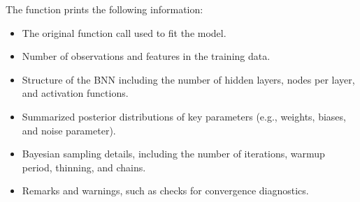\documentclass[a4paper]{book}
\begin{document}
\begin{Details}
The function prints the following information:
\begin{itemize}

\item{}  The original function call used to fit the model.
\item{}  Number of observations and features in the training data.
\item{}  Structure of the BNN including the number of hidden layers, nodes per layer, and activation functions.
\item{}  Summarized posterior distributions of key parameters (e.g., weights, biases, and noise parameter).
\item{}  Bayesian sampling details, including the number of iterations, warmup period, thinning, and chains.
\item{}  Remarks and warnings, such as checks for convergence diagnostics.

\end{itemize}

\end{Details}
%
\end{document}
